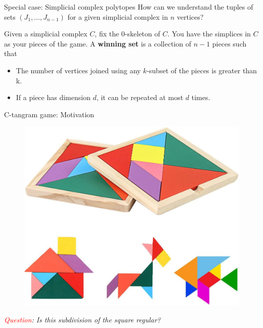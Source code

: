 \documentclass{beamer}
\begin{document}
\begin{frame}{Special case: Simplicial complex polytopes}
How can we understand the tuples of sets $(J_1,\ldots,J_{n-1})$ for a given simplicial complex in $n$ vertices?

\pause
\vspace{0.7cm}

\begin{definition}
Given a simplicial complex $C$, fix the 0-skeleton of $C$. You have the simplices in $C$ as your pieces of the game. \pause A \textbf{winning set} is a collection of $n-1$ pieces such that
\pause
\begin{itemize}
    \item The number of vertices joined using any $k$-subset of the pieces is greater than k. 
    \pause
    \item If a piece has dimension $d$, it can be repeated at most $d$ times. 
\end{itemize}
\end{definition}

\end{frame}

\begin{frame}{C-tangram game: Motivation}
\pause
    \begin{figure}
        \centering
        \includegraphics[scale=0.2]{images/tangram.jpg}
        \label{fig:tangram}
    \end{figure}
\pause
\vspace{0.5cm}
\small \textit{\textcolor{red}{Question}: Is this subdivision of the square regular?}
\end{frame}
\end{document}
